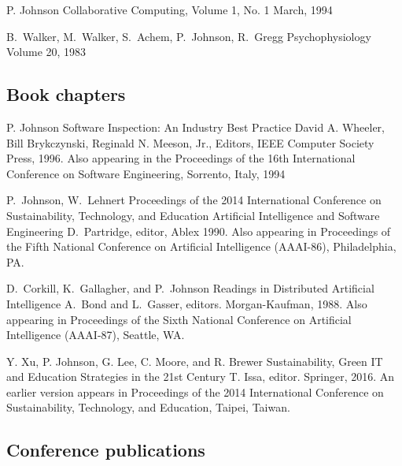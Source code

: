 \documentclass[11pt,letterpaper,sans]{moderncv} %
\begin{document}
          {P. Johnson}
          {Collaborative Computing, Volume 1, No. 1}
          {March, 1994}

          {B.~Walker, M.~Walker, S.~Achem, P.~Johnson, R.~Gregg}
          {Psychophysiology}
          {Volume 20, 1983}

\subsection{Book chapters}


          {P. Johnson}
          {Software Inspection:  An Industry Best Practice}
          {David A. Wheeler, Bill Brykczynski, Reginald N. Meeson, Jr., Editors, IEEE Computer Society Press, 1996.
          Also appearing in the Proceedings of the 16th International Conference on Software Engineering, Sorrento, Italy, 1994}

          {P.~Johnson, W.~Lehnert}
Proceedings of the 2014 International Conference on Sustainability, Technology, and Education          {Artificial Intelligence and Software Engineering}
          {D.~Partridge, editor, Ablex 1990. Also appearing in Proceedings of the Fifth National Conference on
  Artificial Intelligence (AAAI-86), Philadelphia, PA.}

          {D.~Corkill, K.~Gallagher, and P.~Johnson}
          {Readings in Distributed Artificial Intelligence}
          {A.~Bond and L.~Gasser, editors.  Morgan-Kaufman, 1988.  Also appearing in Proceedings of the Sixth National Conference on Artificial Intelligence (AAAI-87), Seattle, WA.}

          {Y. Xu, P.  Johnson, G. Lee, C. Moore, and R. Brewer}
          {Sustainability, Green IT and Education Strategies in the 21st Century}
          {T. Issa, editor.  Springer, 2016.  An earlier version appears in Proceedings of the 2014 International Conference on Sustainability, Technology, and Education, Taipei, Taiwan.}

\subsection{Conference publications}
\end{document}
